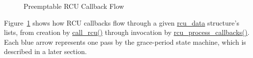 \begin{figure}[htb]
\begin{center}
\end{center}
\caption{Preemptable RCU Callback Flow}
\label{app:rcuimpl:Preemptable RCU Callback Flow}
\end{figure}

Figure~\ref{app:rcuimpl:Preemptable RCU Callback Flow}
shows how RCU callbacks flow through a given
\url{rcu_data} structure's lists, from creation by
\url{call_rcu()} through invocation by
\url{rcu_process_callbacks()}.
Each blue arrow represents one pass by the grace-period state machine,
which is described in a later section.



